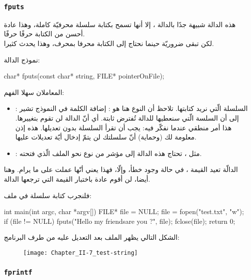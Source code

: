 \subsubsection{\texttt{fputs}}

هذه الدالة شبيهة جدًا بالدالة
،
إلا أنها تسمح بكتابة سلسلة محرفيّة كاملة، وهذا عادة أحسن من الكتابة حرفًا حرفًا.\\
لكن
تبقى ضروريّة حينما نحتاج إلى الكتابة محرفا بمحرف، وهذا يحدث كثيرا.

نموذج الدالة:

\begin{Csource}
char* fputs(const char* string, FILE* pointerOnFile);
\end{Csource}

المعاملان سهلا الفهم:
\begin{itemize}
  \item {}:
السلسلة الّتي نريد كتابتها. تلاحظ أن النوع هنا هو
:
إضافة الكلمة
في النموذج تشير إلى أن السلسة الّتي سنعطيها للدالة تُفترض ثابتة. أي أنّ الدالة لن تقوم بتغييرها. هذا أمر منطقي عندما نفكّر فيه:
يجب أن تقرأ السلسلة بدون تعديلها. هذه إذن معلومة لك (وحماية) أنّ سلسلتك لن يتمّ إدخال أيّة تعديلات عليها.
  \item {}:
 مثل
،
 تحتاج هذه الدالة إلى مؤشر من نوع
نحو الملف الّذي فتحته.
\end{itemize}

الدالّة تعيد القيمة
،
في حالة وجود خطأ، وإلّا، فهذا يعني أنّها عملت على ما يرام. وهنا أيضا، لن أقوم عادة باختبار القيمة التي ترجعها الدالة.

فلنجرب كتابة سلسلة في ملف:

\begin{Csource}
int main(int argc, char *argv[])
{
	FILE* file = NULL;
	file = fopen("test.txt", "w");
	if (file != NULL)
	{
    	 	fputs("Hello my friends\nHow are you ?", file);
    	 	fclose(file);
	}
	return 0;
}
\end{Csource}

الشكل التالي يظهر الملف بعد التعديل عليه من طرف البرنامج:

\begin{figure}[H]
	\centering
	\texttt{[image: Chapter\_II-7\_test-string]}
\end{figure}

\subsubsection{\texttt{fprintf}}

